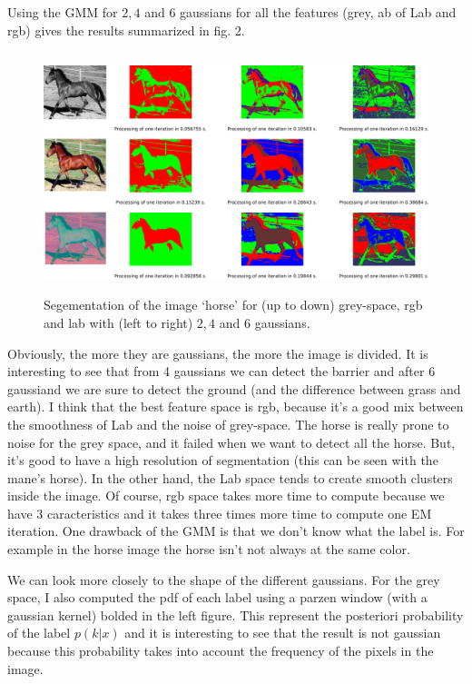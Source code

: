 \documentclass[runningheads,a4paper]{llncs}
\begin{document}
Using the GMM for $2, 4$ and $6$ gaussians for all the features (grey, ab of Lab and rgb) gives the results summarized in fig. 2.
\begin{figure}
\centering
\includegraphics[height=7cm]{Figures/labels_horse}
\caption{Segementation of the image `horse' for (up to down) grey-space, rgb and lab with (left to right) $2,4$ and $6$ gaussians.}
\end{figure}
\par Obviously, the more they are gaussians, the more the image is divided. It is interesting to see that from 4 gaussians we can detect the barrier and after 6 gaussiand we are sure to detect the ground (and the difference between grass and earth). I think that the best feature space is rgb, because it's a good mix between the smoothness of Lab and the noise of grey-space. The horse is really prone to noise for the grey space, and it failed when we want to detect all the horse. But, it's good to have a high resolution of segmentation (this can be seen with the mane's horse). In the other hand, the Lab space tends to create smooth clusters inside the image. Of course, rgb space takes more time to compute because we have 3 caracteristics and it takes three times more time to compute one EM iteration. One drawback of the GMM is that we don't know what the label is. For example in the horse image the horse isn't not always at the same color.

\par We can look more closely to the shape of the different gaussians. For the grey space, I also computed the pdf of each label using a parzen window (with a gaussian kernel) bolded in the left figure. This represent the posteriori probability of the label $p(k|x)$ and it is interesting to see that the result is not gaussian because this probability takes into account the frequency of the pixels in the image.
\end{document}
